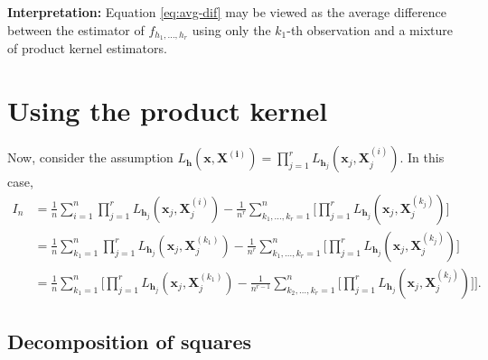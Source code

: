 \documentclass{article}
\begin{document}
\textbf{Interpretation:} Equation \ref{eq:avg-dif} may be viewed as the average difference between the estimator of $f_{h_1, \dots, h_r}$ using only the $k_1$-th observation and a mixture of product kernel estimators. 

\section{Using the product kernel}

Now, consider the assumption $L_{\mathbf{h}}(\mathbf{x},\mathbf{X^{(i)}}) = \prod_{j=1}^{r} L_{\mathbf{h}_j}(\mathbf{x}_j,\mathbf{X}_j^{(i)})$. In this case,
\begin{align}
    I_n &= \frac{1}{n} \sum_{i=1}^{n} \prod_{j=1}^{r} L_{\mathbf{h}_j}(\mathbf{x}_j,\mathbf{X}_j^{(i)}) - \frac{1}{n^r} \sum_{k_1, \dots, k_r =1}^{n} \Big[ \prod_{j=1}^{r} L_{\mathbf{h}_j}(\mathbf{x}_j,\mathbf{X}_j^{(k_j)}) \Big] \\
    &= \frac{1}{n} \sum_{k_1=1}^{n} \prod_{j=1}^{r} L_{\mathbf{h}_j}(\mathbf{x}_j,\mathbf{X}_j^{(k_1)}) - \frac{1}{n^r} \sum_{k_1, \dots, k_r =1}^{n} \Big[ \prod_{j=1}^{r} L_{\mathbf{h}_j}(\mathbf{x}_j,\mathbf{X}_j^{(k_j)}) \Big] \\
    &= \frac{1}{n} \sum_{k_1=1}^{n} \Big[ \prod_{j=1}^{r} L_{\mathbf{h}_j}(\mathbf{x}_j,\mathbf{X}_j^{(k_1)}) - \frac{1}{n^{r-1}} \sum_{k_2, \dots, k_r =1}^{n} \Big[ \prod_{j=1}^{r} L_{\mathbf{h}_j}(\mathbf{x}_j,\mathbf{X}_j^{(k_j)}) \Big] \Big].
\end{align}

\subsection{Decomposition of squares}
\end{document}
